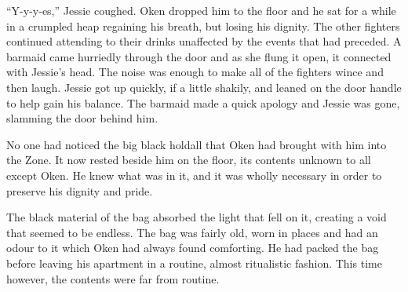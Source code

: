 ``Y-y-y-es,'' Jessie coughed. Oken dropped him to the floor and he sat for a while in a crumpled heap regaining his breath, but losing his dignity. The other fighters continued attending to their drinks unaffected by the events that had preceded. A barmaid came hurriedly through the door and as she flung it open, it connected with Jessie's head. The noise was enough to make all of the fighters wince and then laugh. Jessie got up quickly, if a little shakily, and leaned on the door handle to help gain his balance. The barmaid made a quick apology and Jessie was gone, slamming the door behind him.

No one had noticed the big black holdall that Oken had brought with him into the Zone. It now rested beside him on the floor, its contents unknown to all except Oken. He knew what was in it, and it was wholly necessary in order to preserve his dignity and pride. 

The black material of the bag absorbed the light that fell on it, creating a void that seemed to be endless. The bag was fairly old, worn in places and had an odour to it which Oken had always found comforting. He had packed the bag before leaving his apartment in a routine, almost ritualistic fashion. This time however, the contents were far from routine.



